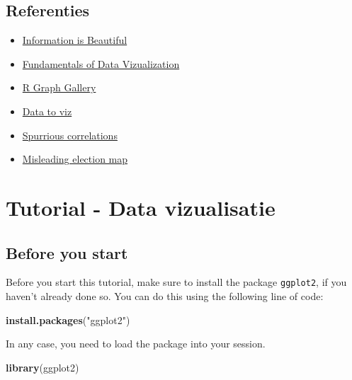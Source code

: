 \documentclass[]{tufte-book}
\newenvironment{Shaded}{}{}
\newcommand{\KeywordTok}[1]{\textcolor[rgb]{0.00,0.44,0.13}{\textbf{#1}}}
\newcommand{\NormalTok}[1]{#1}
\newcommand{\StringTok}[1]{\textcolor[rgb]{0.25,0.44,0.63}{#1}}
\providecommand{\tightlist}{%
  \setlength{\itemsep}{0pt}\setlength{\parskip}{0pt}}
\begin{document}
\hypertarget{referenties-1}{%
\section{Referenties}\label{referenties-1}}

\begin{itemize}
\tightlist
\item
  \href{https://informationisbeautiful.net/}{Information is Beautiful}
\item
  \href{https://serialmentor.com/dataviz/}{Fundamentals of Data Vizualization}
\item
  \href{https://www.r-graph-gallery.com/}{R Graph Gallery}
\item
  \href{https://www.data-to-viz.com/}{Data to viz}
\item
  \href{https://www.tylervigen.com/spurious-correlations}{Spurrious correlations}
\item
  \href{https://edition.cnn.com/2020/01/17/politics/donald-trump-2016-map-county-by-county/index.html}{Misleading election map}
\end{itemize}

\hypertarget{tutorial---data-vizualisatie}{%
\chapter{Tutorial - Data vizualisatie}\label{tutorial---data-vizualisatie}}

\hypertarget{before-you-start}{%
\section{Before you start}\label{before-you-start}}

Before you start this tutorial, make sure to install the package \texttt{ggplot2}, if you haven't already done so. You can do this using the following line of code:

\begin{Shaded}
\begin{Highlighting}[]
\KeywordTok{install.packages}\NormalTok{(}\StringTok{"ggplot2"}\NormalTok{)}
\end{Highlighting}
\end{Shaded}

In any case, you need to load the package into your session.

\begin{Shaded}
\begin{Highlighting}[]
\KeywordTok{library}\NormalTok{(ggplot2)}
\end{Highlighting}
\end{Shaded}
\end{document}
